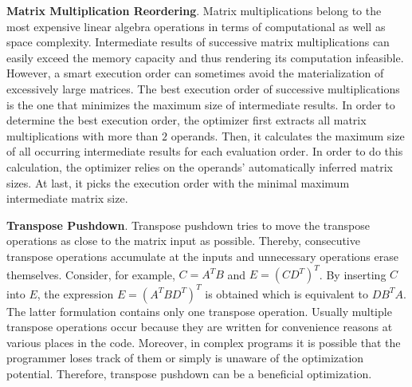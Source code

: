 \textbf{Matrix Multiplication Reordering}. Matrix multiplications belong to the most expensive linear algebra operations in terms of computational as well as space complexity. 
Intermediate results of successive matrix multiplications can easily exceed the memory capacity and thus rendering its computation infeasible. However, a smart execution order can sometimes avoid the materialization of excessively large matrices. 
The best execution order of successive multiplications is the one that minimizes the maximum size of intermediate results.
In order to determine the best execution order, the optimizer first extracts all matrix multiplications with more than $2$ operands.
Then, it calculates the maximum size of all occurring intermediate results for each evaluation order.
In order to do this calculation, the optimizer relies on the operands' automatically inferred matrix sizes.
At last, it picks the execution order with the minimal maximum intermediate matrix size.

\textbf{Transpose Pushdown}. Transpose pushdown tries to move the transpose operations as close to the matrix input as possible.
Thereby, consecutive transpose operations accumulate at the inputs and unnecessary operations erase themselves.
Consider, for example, $C = A^TB$ and $E = (CD^T)^T$.
By inserting $C$ into $E$, the expression $E=(A^T BD^T)^T$ is obtained which is equivalent to $DB^T A$. 
The latter formulation contains only one transpose operation. 
Usually multiple transpose operations occur because they are written for convenience reasons at various places in the code. 
Moreover, in complex programs it is possible that the programmer loses track of them or simply is unaware of the optimization potential. 
Therefore, transpose pushdown can be a beneficial optimization.